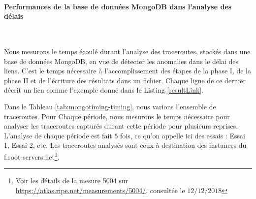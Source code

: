 



\paragraph{Performances de la base de données MongoDB dans l'analyse des délais }~


Nous mesurons le temps écoulé durant l'analyse des traceroutes, stockés dans une base de données MongoDB,  en vue de détecter les anomalies dans le délai des liens. C'est le temps nécessaire à l'accomplissement des étapes de la phase I, de la phase II et de l'écriture des résultats dans un fichier. Chaque ligne de ce dernier  décrit un lien comme l'exemple donné dans le Listing \ref{resultLink}.  

Dans le Tableau \ref{tab:mongotiming-timing}, nous varions l'ensemble de traceroutes. Pour Chaque période, nous mesurons le temps nécessaire pour analyser les traceroutes capturés durant cette période pour plusieurs reprises. L'analyse de chaque période est fait $5$ fois, ce qu'on appelle ici des essais : Essai 1, Essai 2, etc.  Les traceroutes analysés sont ceux à destination des instances du f.root-servers.net\footnote{Voir les détails de la mesure 5004 sur \url{https://atlas.ripe.net/measurements/5004/}, consultée le $12/12/2018$}.

